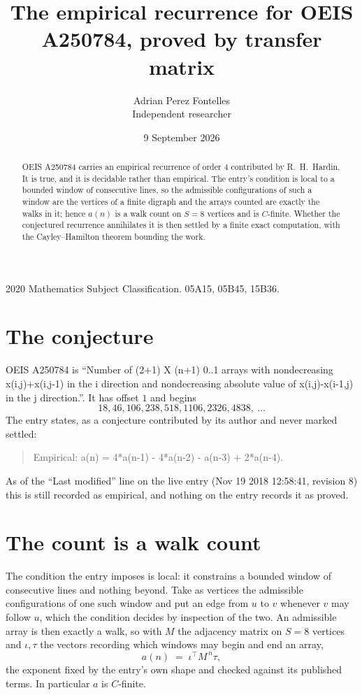 \documentclass[11pt,a4paper]{article}
\title{The empirical recurrence for OEIS A250784, proved by transfer matrix}
\author{Adrian Perez Fontelles\\ \small Independent researcher}
\date{9 September 2026}
\theoremstyle{plain}
\theoremstyle{definition}
\begin{document}
\maketitle

\begin{abstract}
OEIS A250784 carries an empirical recurrence of order $4$ contributed by R.~H.~Hardin. It is
true, and it is decidable rather than empirical. The entry's condition is local to a bounded window of consecutive lines, so
the admissible configurations of such a window are the vertices of a finite digraph and the
arrays counted are exactly the walks in it; hence $a(n)$ is a walk count on $S=8$ vertices
and is $C$-finite. Whether the conjectured recurrence annihilates it is then settled by a
finite exact computation, with the Cayley--Hamilton theorem bounding the work.
\end{abstract}

\noindent\small 2020 Mathematics Subject Classification. 05A15, 05B45, 15B36.\normalsize

\section{The conjecture}

OEIS A250784 is ``Number of (2+1) X (n+1) 0..1 arrays with nondecreasing x(i,j)+x(i,j-1) in the i direction and nondecreasing absolute value of x(i,j)-x(i-1,j) in the j direction.''. It has offset $1$ and begins
\[
18, 46, 106, 238, 518, 1106, 2326, 4838,\ \dots
\]
The entry states, as a conjecture contributed by its author and never marked settled:
\begin{quote}
Empirical: a(n) = 4*a(n-1) - 4*a(n-2) - a(n-3) + 2*a(n-4).
\end{quote}
As of the ``Last modified'' line on the live entry (Nov 19 2018 12:58:41, revision 8) this is still
recorded as empirical, and nothing on the entry records it as proved.

\section{The count is a walk count}

The condition the entry imposes is local: it constrains a bounded window of consecutive lines and nothing beyond. Take as
vertices the admissible configurations of one such window and put an edge from $u$ to $v$
whenever $v$ may follow $u$, which the condition decides by inspection of the two. An
admissible array is then exactly a walk, so with $M$ the adjacency matrix on $S=8$ vertices
and $\iota,\tau$ the vectors recording which windows may begin and end an array,
\[
a(n)\;=\;\iota^{\!\top}M^{\,n}\tau ,
\]
the exponent fixed by the entry's own shape and checked against its published terms. In
particular $a$ is $C$-finite.
\end{document}
